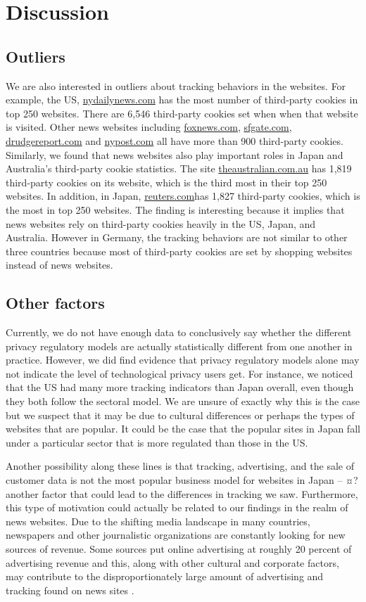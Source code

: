 \documentclass[conference]{IEEEtran}
\begin{document}
\section{Discussion}

\subsection{Outliers}
We are also interested in outliers about tracking behaviors in the websites. For example,  the US, \url{nydailynews.com} has the most number of third-party cookies in top 250 websites. There are 6,546 third-party cookies set when when that website is visited. Other news websites including \url{foxnews.com}, \url{sfgate.com}, \url{drudgereport.com} and \url{nypost.com} all have more than 900 third-party cookies. Similarly, we found that news websites also play important roles in Japan and Australia's third-party cookie statistics. The site \url{theaustralian.com.au} has 1,819 third-party cookies on its website, which is the third most in their top 250 websites. In addition, in Japan, \url{reuters.com}has 1,827 third-party cookies, which is the most in top 250 websites. The finding is interesting because it implies that news websites rely on third-party cookies heavily in the US, Japan, and Australia. However in Germany, the tracking behaviors are not similar to other three countries because most of third-party cookies are set by shopping websites instead of news websites.  

\subsection{Other factors}
Currently, we do not have enough data to conclusively say whether the different privacy regulatory models are actually statistically different from one another in practice.  However, we did find evidence that privacy regulatory models alone may not indicate the level of technological privacy users get. For instance, we noticed that the US had many more tracking indicators than Japan overall, even though they both follow the sectoral model. We are unsure of exactly why this is the case but we suspect that it may be due to cultural differences or perhaps the types of websites that are popular. It could be the case that the popular sites in Japan fall under a particular sector that is more regulated than those in the US. 

Another possibility along these lines is that tracking, advertising, and the sale of customer data is not the most popular business model for websites in Japan -- ¤?another factor that could lead to the differences in tracking we saw. Furthermore, this type of motivation could actually be related to our findings in the realm of news websites. Due to the shifting media landscape in many countries, newspapers and other journalistic organizations are constantly looking for new sources of revenue. Some sources put online advertising at roughly 20 percent of advertising revenue and this, along with other cultural and corporate factors, may contribute to the disproportionately large amount of advertising and tracking found on news sites \cite{economist}.
\end{document}
